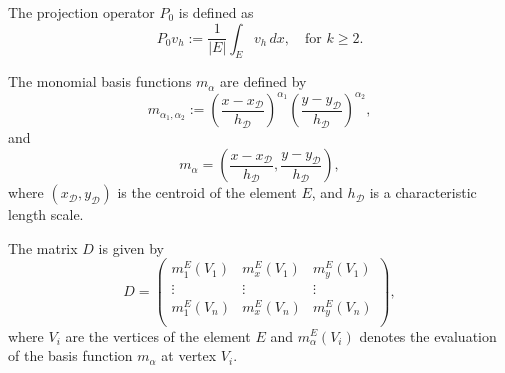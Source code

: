 \documentclass[class=article, crop=false]{standalone}
\begin{document}
The projection operator $P_0$ is defined as
\begin{equation}
    P_0 v_h := \frac{1}{|E|} \int_E v_h \, dx, \quad \text{for } k \geq 2.
\end{equation}

The monomial basis functions $m_{\alpha}$ are defined by
\begin{equation}
    m_{\alpha_1,\alpha_2} := \left( \frac{x - x_{\mathcal{D}}}{h_{\mathcal{D}}} \right)^{\alpha_1}
    \left( \frac{y - y_{\mathcal{D}}}{h_{\mathcal{D}}} \right)^{\alpha_2},
\end{equation}
and
\begin{equation}
    m_{\alpha} = \left( \frac{x - x_{\mathcal{D}}}{h_{\mathcal{D}}}, \frac{y - y_{\mathcal{D}}}{h_{\mathcal{D}}} \right),
\end{equation}
where $(x_{\mathcal{D}}, y_{\mathcal{D}})$ is the centroid of the element $E$, and $h_{\mathcal{D}}$ is a characteristic length scale.

The matrix $D$ is given by
\begin{equation}
    D = \begin{pmatrix}
        m_1^E(V_1) & m_x^E(V_1) & m_y^E(V_1) \\
        \vdots & \vdots & \vdots \\
        m_1^E(V_n) & m_x^E(V_n) & m_y^E(V_n) \\
    \end{pmatrix},
\end{equation}
where $V_i$ are the vertices of the element $E$ and $m_{\alpha}^E(V_i)$ denotes the evaluation of the basis function $m_{\alpha}$ at vertex $V_i$.
\end{document}
